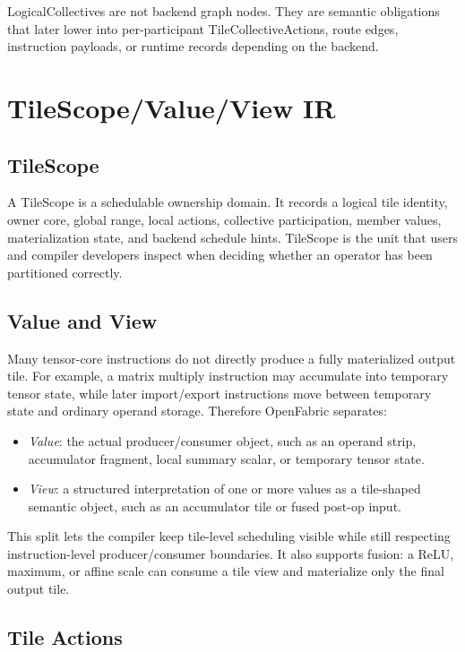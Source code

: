 \documentclass[conference]{IEEEtran}
\newcommand{\systemname}{OpenFabric}
\begin{document}
LogicalCollectives are not backend graph nodes. They are semantic obligations
that later lower into per-participant TileCollectiveActions, route edges,
instruction payloads, or runtime records depending on the backend.

\section{TileScope/Value/View IR}

\subsection{TileScope}

A TileScope is a schedulable ownership domain. It records a logical tile
identity, owner core, global range, local actions, collective participation,
member values, materialization state, and backend schedule hints. TileScope is
the unit that users and compiler developers inspect when deciding whether an
operator has been partitioned correctly.

\subsection{Value and View}

Many tensor-core instructions do not directly produce a fully materialized
output tile. For example, a matrix multiply instruction may accumulate into
temporary tensor state, while later import/export instructions move between
temporary state and ordinary operand storage. Therefore \systemname{} separates:
\begin{itemize}
\item \textit{Value}: the actual producer/consumer object, such as an operand
strip, accumulator fragment, local summary scalar, or temporary tensor state.
\item \textit{View}: a structured interpretation of one or more values as a
tile-shaped semantic object, such as an accumulator tile or fused post-op input.
\end{itemize}

This split lets the compiler keep tile-level scheduling visible while still
respecting instruction-level producer/consumer boundaries. It also supports
fusion: a ReLU, maximum, or affine scale can consume a tile view and materialize
only the final output tile.

\subsection{Tile Actions}
\end{document}
